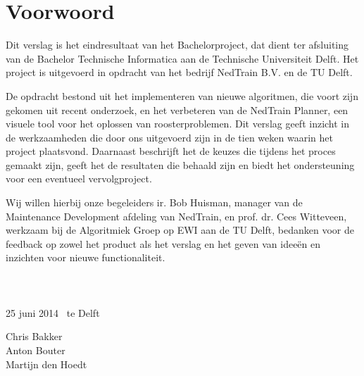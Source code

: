 \section*{Voorwoord}
Dit verslag is het eindresultaat van het Bachelorproject, dat dient ter afsluiting van de Bachelor Technische Informatica aan de Technische Universiteit Delft. Het project is uitgevoerd in opdracht van het bedrijf NedTrain B.V. en de TU Delft.

De opdracht bestond uit het implementeren van nieuwe algoritmen, die voort zijn gekomen uit recent onderzoek, en het verbeteren van de NedTrain Planner, een visuele tool voor het oplossen van roosterproblemen. Dit verslag geeft inzicht in de werkzaamheden die door ons uitgevoerd zijn in de tien weken waarin het project plaatsvond. Daarnaast beschrijft het de keuzes die tijdens het proces gemaakt zijn, geeft het de resultaten die behaald zijn en biedt het ondersteuning voor een eventueel vervolgproject.

Wij willen hierbij onze begeleiders ir. Bob Huisman, manager van de Maintenance Development afdeling van NedTrain, en prof. dr. Cees Witteveen, werkzaam bij de Algoritmiek Groep op EWI aan de TU Delft, bedanken voor de feedback op zowel het product als het verslag en het geven van idee\"en en inzichten voor nieuwe functionaliteit. 
\\ \\ \\ \\
25 juni 2014 ~te Delft

Chris Bakker \\
Anton Bouter \\
Martijn den Hoedt
